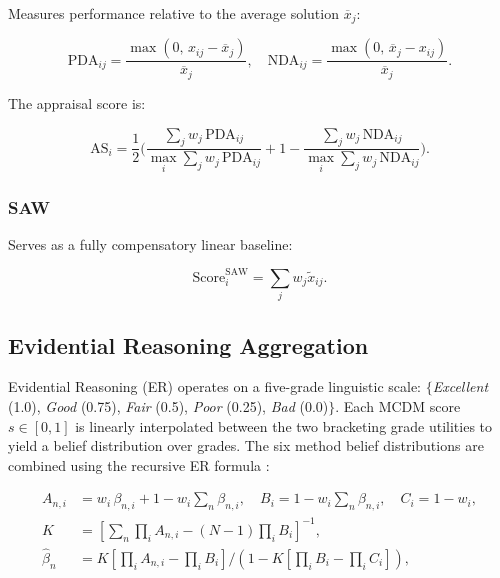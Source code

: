 \documentclass[12pt, a4paper]{article}
\begin{document}
Measures performance relative to the average solution $\overline{x}_j$:

\begin{equation}
  \text{PDA}_{ij} = \frac{\max(0,\, x_{ij} - \overline{x}_j)}{\overline{x}_j},
  \quad \text{NDA}_{ij} = \frac{\max(0,\, \overline{x}_j - x_{ij})}{\overline{x}_j}.
  \label{eq:edas_pda_nda}
\end{equation}

The appraisal score is:

\begin{equation}
  \text{AS}_i = \frac{1}{2}\biggl(
    \frac{\sum_j w_j\, \text{PDA}_{ij}}{\max_i \sum_j w_j\, \text{PDA}_{ij}}
    + 1 -
    \frac{\sum_j w_j\, \text{NDA}_{ij}}{\max_i \sum_j w_j\, \text{NDA}_{ij}}
  \biggr).
  \label{eq:edas_score}
\end{equation}

\subsubsection{SAW \citep{Fishburn1967}}

Serves as a fully compensatory linear baseline:

\begin{equation}
  \text{Score}_i^{\text{SAW}} = \sum_j w_j \tilde{x}_{ij}.
  \label{eq:saw}
\end{equation}

\subsection{Evidential Reasoning Aggregation}

Evidential Reasoning (ER) \citep{YangXu2002} operates on a five-grade
linguistic scale: $\{$\textit{Excellent} (1.0), \textit{Good} (0.75),
\textit{Fair} (0.5), \textit{Poor} (0.25), \textit{Bad} (0.0)$\}$.
Each MCDM score $s \in [0,1]$ is linearly interpolated between the two
bracketing grade utilities to yield a belief distribution over grades. The six
method belief distributions are combined using the recursive ER formula
\citep[Eq.~9]{YangXu2002}:

\begin{align}
  A_{n,i} &= w_i\,\beta_{n,i} + 1 - w_i \sum_n \beta_{n,i}, \quad
  B_i = 1 - w_i \sum_n \beta_{n,i}, \quad C_i = 1 - w_i, \label{eq:er_A}\\
  K &= \left[\sum_n \prod_i A_{n,i} - (N-1)\prod_i B_i\right]^{-1}, \label{eq:er_K}\\
  \hat{\beta}_n &= K\left[\prod_i A_{n,i} - \prod_i B_i\right] \bigg/
    \left(1 - K\left[\prod_i B_i - \prod_i C_i\right]\right), \label{eq:er_beta}
\end{align}
\end{document}
